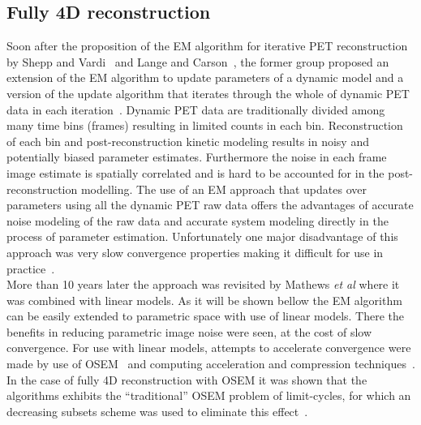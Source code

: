 \subsection{Fully 4D reconstruction}
Soon after the proposition of the EM algorithm for iterative PET reconstruction by Shepp and Vardi~\cite{Vardi1985} and Lange and Carson~\cite{Lange1984}, the former group proposed an extension of the EM algorithm to update parameters of a dynamic model and a version of the update algorithm that iterates through the whole of dynamic PET data in each iteration~\cite{Carson1985}. Dynamic PET data are traditionally divided among many time bins (frames) resulting in limited counts in each bin. Reconstruction of each bin and post-reconstruction kinetic modeling results in noisy and potentially biased parameter estimates. Furthermore the noise in each frame image estimate is spatially correlated and is hard to be accounted for in the post-reconstruction modelling. The use of an EM approach that updates over parameters using all the dynamic PET raw data offers the advantages of accurate noise modeling of the raw data and accurate system modeling directly in the process of parameter estimation. Unfortunately one major disadvantage of this approach was very slow convergence properties making it difficult for use in practice~\cite{Carson1985}. \\
More than 10 years later the approach was revisited by Mathews \textit{et al}\cite{Matthews1995} where it was combined with linear models. As it will be shown bellow the EM algorithm can be easily extended to parametric space with use of linear models. There the benefits in reducing parametric image noise were seen, at the cost of slow convergence. For use with linear models, attempts to accelerate convergence were made by use of OSEM~\cite{Tsoumpas2008} and computing acceleration and compression techniques~\cite{Hong2008}. In the case of fully 4D reconstruction with OSEM it was shown that the algorithms exhibits the “traditional” OSEM problem of limit-cycles, for which an decreasing subsets scheme was used to eliminate this effect~\cite{Angelis2011}. \\

